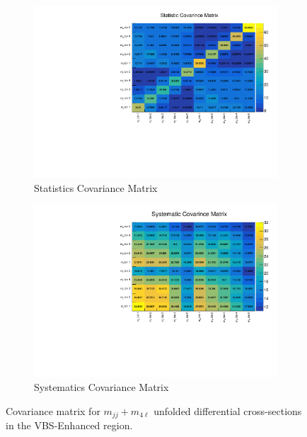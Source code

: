 \begin{figure}[!htbp]
    \centering
    \begin{subfigure}{.49\textwidth}
        \centering
        \includegraphics[width=.98\linewidth]{figures/Results/EFT/Cov_stat.pdf}
        \caption{ Statistics Covariance Matrix \label{fig:StatCov_mjj_m4l}}
    \end{subfigure}
    \begin{subfigure}{.49\textwidth}
        \centering
        \includegraphics[width=.98\linewidth]{figures/Results/EFT/Cov_syst.pdf}
        \caption{ Systematics Covariance Matrix \label{fig:SysCov_mjj_m4l} }
    \end{subfigure}
    \caption{Covariance matrix for $m_{jj}+m_{4\ell}$ unfolded differential cross-sections in the VBS-Enhanced region. }  \label{fig:Cov_mjj_m4l}
\end{figure}
